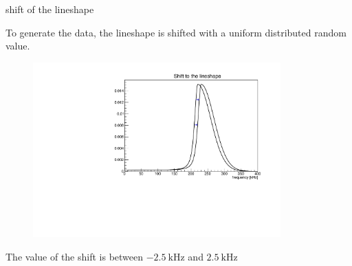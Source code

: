 \documentclass[8pt]{beamer}
\newcommand{\nologo}{\setbeamertemplate{logo}{}}
\begin{document}
{\nologo
\begin{frame}{shift of the lineshape}

To generate the data, the lineshape is shifted with a uniform distributed random value.

\begin{figure}[hbtp]
\centering
\includegraphics[width = 0.85\textwidth]{ShiftedLineshape.pdf}
\end{figure}
\begin{center}
The value of the shift is between $\SI{-2.5}{\kilo \hertz}$ and $\SI{2.5}{\kilo \hertz}$
\end{center}

\end{frame}
}
\end{document}
